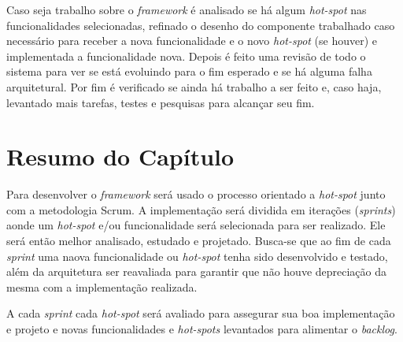 Caso seja trabalho sobre o \textit{framework} é analisado se há algum \textit{hot-spot} nas funcionalidades selecionadas, refinado o desenho do componente trabalhado caso necessário para receber a nova funcionalidade e o novo \textit{hot-spot} (se houver) e implementada a funcionalidade nova. Depois é feito uma revisão de todo o sistema para ver se está evoluindo para o fim esperado e se há alguma falha arquitetural. Por fim é verificado se ainda há trabalho a ser feito e, caso haja, levantado mais tarefas, testes e pesquisas para alcançar seu fim.

\section{Resumo do Capítulo}

Para desenvolver o \textit{framework} será usado o processo orientado a \textit{hot-spot} junto com a metodologia Scrum. A implementação será dividida em iterações (\textit{sprints}) aonde um \textit{hot-spot} e/ou funcionalidade será selecionada para ser realizado. Ele será então melhor analisado, estudado e projetado. Busca-se que ao fim de cada \textit{sprint} uma naova funcionalidade ou \textit{hot-spot} tenha sido desenvolvido e testado, além da arquitetura ser reavaliada para garantir que não houve depreciação da mesma com a implementação realizada.

A cada \textit{sprint} cada \textit{hot-spot} será avaliado para assegurar sua boa implementação e projeto e novas funcionalidades e \textit{hot-spots} levantados para alimentar o \textit{backlog}.